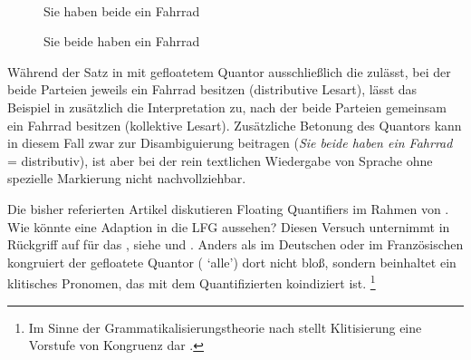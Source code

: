 \begin{figure}
\\
\caption{Sie haben beide ein Fahrrad}
\label{fig:siebeidefhrd_1}
\end{figure}

\begin{figure}
\caption{Sie beide haben ein Fahrrad}
\label{fig:siebeidefhrd_2}
\end{figure}

Während der Satz in  mit gefloatetem Quantor
ausschließlich die  zulässt, bei der beide Parteien jeweils ein
Fahrrad besitzen (distributive Lesart), lässt das Beispiel in
 zusätzlich die Interpretation zu, nach der beide
Parteien gemeinsam ein Fahrrad besitzen (kollektive Lesart). Zusätzliche
Betonung des Quantors kann in diesem Fall zwar zur Disambiguierung beitragen
(\emph{Sie \emph{beide} haben ein Fahrrad} = distributiv), ist aber bei der
rein textlichen Wiedergabe von Sprache ohne spezielle Markierung nicht
nachvollziehbar.

\label{phsec:hebrqf}
Die bisher referierten Artikel diskutieren Floating Quantifiers im Rahmen von
 \autocite{chomsky1981}. Wie könnte eine Adaption
in die LFG
aussehen? Diesen Versuch unternimmt \citet{spector2009} in Rückgriff auf
\citet{shlonsky1991} für das , siehe  und
. Anders als im Deutschen oder im
Französischen kongruiert der gefloatete Quantor (
`alle') dort nicht bloß, sondern beinhaltet ein klitisches Pronomen, das mit
dem Quantifizierten koindiziert ist.%
%
	\footnote{Im Sinne der
		Grammatikalisierungs\-theorie nach
		\citet{lehmann2015} stellt Klitisierung eine Vorstufe von Kongruenz dar
		\autocite[vgl.][44]{lehmann2015}.%
	}

